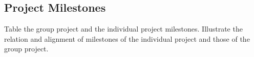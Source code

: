 \subsection{Project Milestones}
Table the group project and the individual project milestones. Illustrate the relation and alignment of milestones of the individual project and those of the group project.